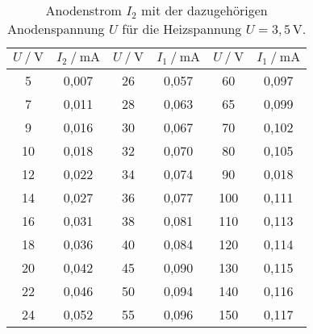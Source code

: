 \begin{table}[H]
    \centering
    \caption{Anodenstrom $I_2$ mit der dazugehörigen Anodenspannung $U$ für die Heizspannung $U = 3,5 \, \unit{\volt} $.}
    \label{tab:kennlini1_2}
    \begin{tabular}{S S S S S[table-format=3.1] S}
      \toprule
      {$U \mathbin{/} \unit{\volt}$} & {$I_2 \mathbin{/} \unit{\milli\ampere}$} & {$U \mathbin{/} \unit{\volt}$} & {$I_1 \mathbin{/} \unit{\milli\ampere}$} & {$U \mathbin{/} \unit{\volt}$} & {$I_1 \mathbin{/} \unit{\milli\ampere}$}  \\
      \midrule
            {5}&       {0,007}&        {26}&      {0,057}&        {60}&      {0,097}\\
            {7}&       {0,011}&        {28}&      {0,063}&        {65}&      {0,099}\\
            {9}&       {0,016}&        {30}&      {0,067}&        {70}&      {0,102}\\
            {10}&      {0,018}&        {32}&      {0,070}&        {80}&      {0,105}\\
            {12}&      {0,022}&        {34}&      {0,074}&        {90}&      {0,018}\\
            {14}&      {0,027}&        {36}&      {0,077}&        {100}&     {0,111}\\
            {16}&      {0,031}&        {38}&      {0,081}&        {110}&     {0,113}\\
            {18}&      {0,036}&        {40}&      {0,084}&        {120}&     {0,114}\\
            {20}&      {0,042}&        {45}&      {0,090}&        {130}&     {0,115}\\
            {22}&      {0,046}&        {50}&      {0,094}&        {140}&     {0,116}\\
            {24}&      {0,052}&        {55}&      {0,096}&        {150}&     {0,117}\\

      \bottomrule
    \end{tabular}
\end{table}

